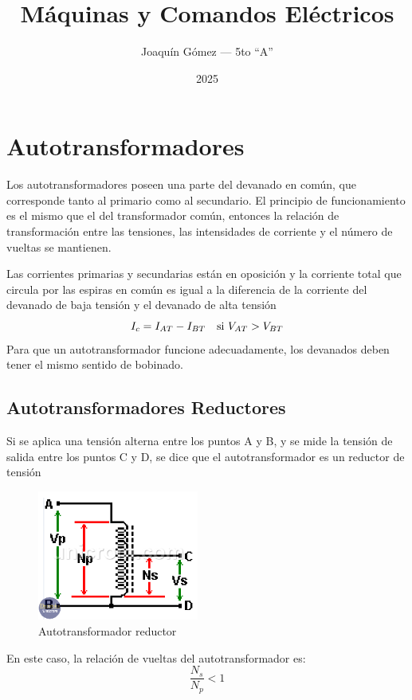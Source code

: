\documentclass[11pt]{report}
\title{Máquinas y Comandos Eléctricos}
\author{Joaquín Gómez --- 5to ``A''}
\date{2025}
\begin{document}
\maketitle

\chapter{Autotransformadores}
Los autotransformadores poseen una parte del devanado en común, que corresponde
tanto al
primario como al secundario.
El principio de funcionamiento es el mismo que el del transformador común,
entonces la relación de
transformación entre las tensiones, las intensidades de corriente y el número
de vueltas se mantienen.

Las corrientes primarias y secundarias están en oposición y la corriente total
que circula por las espiras
en común es igual a la diferencia de la corriente del devanado de baja tensión
y el devanado de alta tensión
\begin{equation}
  I_c = I_{AT} - I_{BT} \quad \textnormal{si } V_{AT} > V_{BT}
\end{equation}
Para que un autotransformador funcione adecuadamente, los devanados deben tener
el mismo sentido de bobinado.

\section{Autotransformadores Reductores}
Si se aplica una tensión alterna entre los puntos A y B, y se mide la tensión
de salida entre los puntos C y D,
se dice que el autotransformador es un reductor de tensión

\begin{figure}[h]
  \begin{center}
    \includegraphics[width=200px]{autotransformador-reductor.png}
  \end{center}
  \caption{Autotransformador reductor}
\end{figure}

En este caso, la relación de vueltas del autotransformador es:
\begin{equation}
  \frac{N_s}{N_p} < 1
\end{equation}
\end{document}
